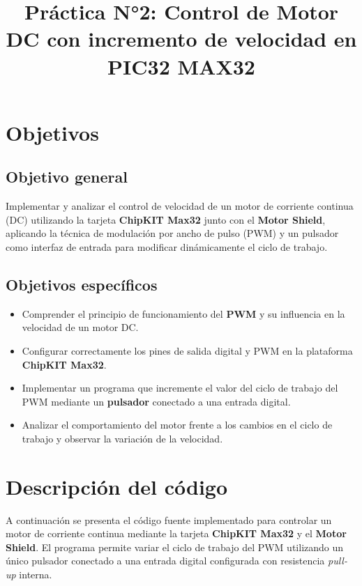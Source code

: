 \documentclass[a4paper,12pt]{article}
\title{Práctica N°2: Control de Motor DC con incremento de velocidad en PIC32 MAX32}
\date{}
\begin{document}
\maketitle
\tableofcontents
\newpage

\section{Objetivos}

\subsection{Objetivo general}
Implementar y analizar el control de velocidad de un motor de corriente continua (DC) utilizando la tarjeta \textbf{ChipKIT Max32} junto con el \textbf{Motor Shield}, aplicando la técnica de modulación por ancho de pulso (PWM) y un pulsador como interfaz de entrada para modificar dinámicamente el ciclo de trabajo.

\subsection{Objetivos específicos}
\begin{itemize}
    \item Comprender el principio de funcionamiento del \textbf{PWM} y su influencia en la velocidad de un motor DC.
    \item Configurar correctamente los pines de salida digital y PWM en la plataforma \textbf{ChipKIT Max32}.
    \item Implementar un programa que incremente el valor del ciclo de trabajo del PWM mediante un \textbf{pulsador} conectado a una entrada digital.
    \item Analizar el comportamiento del motor frente a los cambios en el ciclo de trabajo y observar la variación de la velocidad.
    
\end{itemize}

\section{Descripción del código}

A continuación se presenta el código fuente implementado para controlar un motor de corriente continua mediante la tarjeta \textbf{ChipKIT Max32} y el \textbf{Motor Shield}. El programa permite variar el ciclo de trabajo del PWM utilizando un único pulsador conectado a una entrada digital configurada con resistencia \textit{pull-up} interna.
\end{document}
